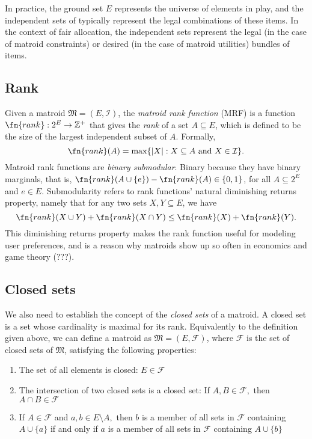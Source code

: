 In practice, the ground set $E$ represents the universe of elements in play, and the independent sets of typically represent the legal combinations of these items. In the context of fair allocation, the independent sets represent the legal (in the case of matroid constraints) or desired (in the case of matroid utilities) bundles of items.

\subsection*{Rank}
Given a matroid $\mathfrak{M} = (E, \mathcal{I})$, the \textit{matroid rank function} (MRF) is a function $\fn{rank} : 2^E \to \mathbb{Z}^+$ that gives the \textit{rank} of a set $ A \subseteq E$, which is defined to be the size of the largest independent subset of $A$. Formally, $$\fn{rank}(A) = \max\{|X| : X \subseteq A \text{ and } X \in \mathcal{I}\}.$$ Matroid rank functions are \textit{binary submodular}. Binary because they have binary marginals, that is, $\fn{rank}(A \cup \{ e \}) - \fn{rank}(A) \in \{0,1\}$, for all $A \subseteq 2^E$ and $e \in E$. Submodularity refers to rank functions' natural diminishing returns property, namely that for any two sets $X, Y \subseteq E$, we have $$\fn{rank}(X \cup Y) + \fn{rank}(X \cap Y) \leq \fn{rank}(X) + \fn{rank}(Y).$$ This diminishing returns property makes the rank function useful for modeling user preferences, and is a reason why matroids show up so often in economics and game theory (???).

\subsection*{Closed sets}

We also need to establish the concept of the \textit{closed sets} of a matroid. A closed set is a set whose cardinality is maximal for its rank. Equivalently to the definition given above, we can define a matroid as $\mathfrak{M} = (E, \mathcal{F})$, where $\mathcal{F}$ is the set of closed sets of $\mathfrak{M}$, satisfying the following properties:

\begin{enumerate}
  \item The set of all elements is closed: $E \in \mathcal{F}$
  \item The intersection of two closed sets is a closed set: If $A,B \in \mathcal{F},$ then $A \cap B \in \mathcal{F}$
  \item If $A \in \mathcal{F}$ and $a,b \in E \setminus A,$ then $b$ is a member of all sets in $\mathcal{F}$ containing $A \cup \{a\}$ if and only if $a$ is a member of all sets in $\mathcal{F}$ containing $A \cup \{b\}$
\end{enumerate}

